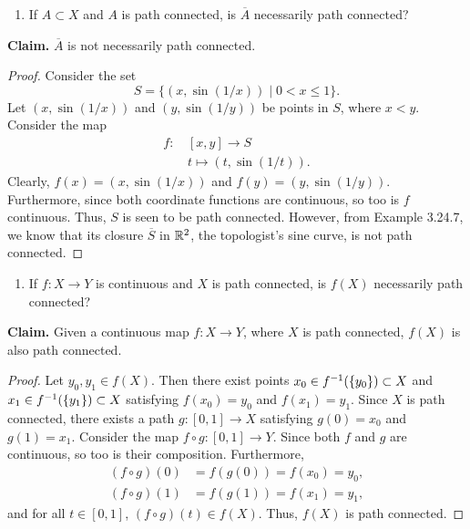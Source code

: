 \begin{solution}
  \begin{enumerate}[label={(\alph*)}, align=left, leftmargin=\parindent, listparindent=\parindent, labelwidth=0pt, itemindent=!]
    \addtocounter{enumi}{1} 
    \item
      If $A \subset X$ and $A$ is path connected, is $\overline{A}$ necessarily path connected?
  \end{enumerate}
  \textbf{Claim.} $\overline{A}$ is not necessarily path connected.
  \begin{proof}
    Consider the set
    \begin{equation*}
      S = \{(x, \sin{(1/x)}) \mid 0 < x \leq 1\}.
    \end{equation*}
    Let $(x, \sin{(1/x)})$ and $(y, \sin{(1/y)})$ be points in $S$, where $x < y$.
    Consider the map
    \begin{equation*}
      \begin{aligned}
        f:\,  &[x, y] \rightarrow S \\
              & t \mapsto (t, \sin{(1/t)}).
      \end{aligned}
    \end{equation*}
    Clearly, $f(x) = (x, \sin{(1/x)})$ and $f(y) = (y, \sin{(1/y)})$.
    Furthermore, since both coordinate functions are continuous, so too is $f$ continuous.
    Thus, $S$ is seen to be path connected.
    However, from Example 3.24.7, we know that its closure $\overline{S}$ in $\mathbb{R}^2$, the topologist's sine curve, is not path connected.
  \end{proof}

  \begin{enumerate}[label={(\alph*)}, align=left, leftmargin=\parindent, listparindent=\parindent, labelwidth=0pt, itemindent=!]
    \addtocounter{enumi}{2} 
    \item 
      If $f: X \rightarrow Y$ is continuous and $X$ is path connected, is $f(X)$ necessarily path connected?
  \end{enumerate}
  \textbf{Claim.} Given a continuous map $f: X \rightarrow Y$, where $X$ is path connected, $f(X)$ is also path connected.
  \begin{proof}
    Let $y_0, y_1 \in f(X)$.
    Then there exist points $x_0 \in f^{-1}(\{y_0\}) \subset X$ and $x_1 \in f^{-1}(\{y_1\}) \subset X$ satisfying $f(x_0) = y_0$ and $f(x_1) = y_1$.
    Since $X$ is path connected, there exists a path $g: [0, 1] \rightarrow X$ satisfying $g(0) = x_0$ and $g(1) = x_1$.
    Consider the map $f \circ g: [0, 1] \rightarrow Y$.
    Since both $f$ and $g$ are continuous, so too is their composition.
    Furthermore,
    \begin{equation*}
      \begin{aligned}
        (f \circ g)(0)  &= f(g(0)) = f(x_0) = y_0, \\
        (f \circ g)(1)  &= f(g(1)) = f(x_1) = y_1,
      \end{aligned}
    \end{equation*}
    and for all $t \in [0, 1]$, $(f \circ g)(t) \in f(X)$.
    Thus, $f(X)$ is path connected.
  \end{proof}
\end{solution}
%

